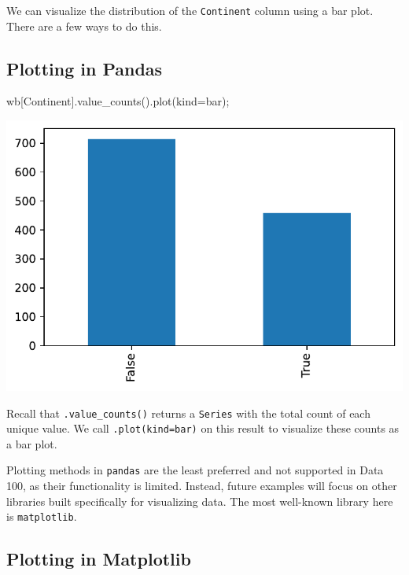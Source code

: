\documentclass[
  letterpaper,
  DIV=11,
  numbers=noendperiod]{scrreprt}
\newenvironment{Shaded}{\begin{snugshade}}{\end{snugshade}}
\newcommand{\NormalTok}[1]{\textcolor[rgb]{0.00,0.23,0.31}{#1}}
\newcommand{\OperatorTok}[1]{\textcolor[rgb]{0.37,0.37,0.37}{#1}}
\newcommand{\StringTok}[1]{\textcolor[rgb]{0.13,0.47,0.30}{#1}}
\begin{document}
We can visualize the distribution of the \texttt{Continent} column using
a bar plot. There are a few ways to do this.

\subsection{Plotting in Pandas}\label{plotting-in-pandas}

\begin{Shaded}
\begin{Highlighting}[]
\NormalTok{wb[}\StringTok{\textquotesingle{}Continent\textquotesingle{}}\NormalTok{].value\_counts().plot(kind}\OperatorTok{=}\StringTok{\textquotesingle{}bar\textquotesingle{}}\NormalTok{)}\OperatorTok{;}
\end{Highlighting}
\end{Shaded}

\includegraphics{visualization_1/visualization_1_files/figure-pdf/cell-3-output-1.pdf}

Recall that \texttt{.value\_counts()} returns a \texttt{Series} with the
total count of each unique value. We call
\texttt{.plot(kind=\textquotesingle{}bar\textquotesingle{})} on this
result to visualize these counts as a bar plot.

Plotting methods in \texttt{pandas} are the least preferred and not
supported in Data 100, as their functionality is limited. Instead,
future examples will focus on other libraries built specifically for
visualizing data. The most well-known library here is
\texttt{matplotlib}.

\subsection{Plotting in Matplotlib}\label{plotting-in-matplotlib}
\end{document}
